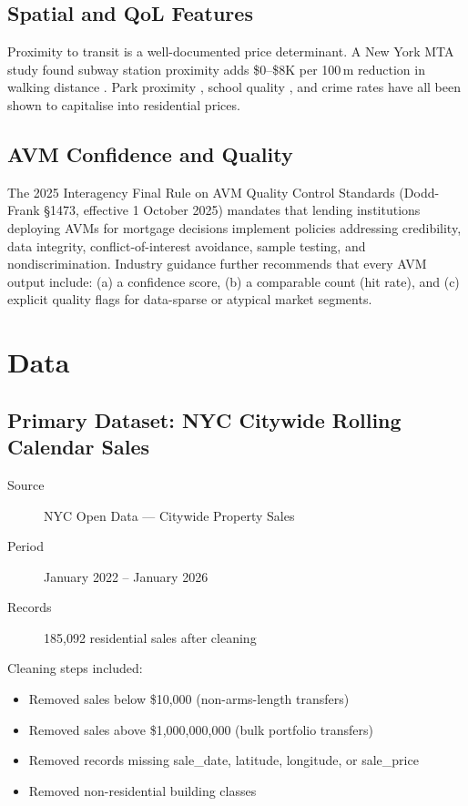 \documentclass[11pt, a4paper, twoside]{article}
\begin{document}
\subsection{Spatial and QoL Features}
Proximity to transit is a well-documented price determinant. A New York MTA
study found subway station proximity adds \$0--\$8K per 100\,m reduction in
walking distance \cite{hess2007}. Park proximity \cite{lutzenhiser2001}, school
quality \cite{black1999}, and crime rates \cite{ihlanfeldt2010} have all been
shown to capitalise into residential prices.

\subsection{AVM Confidence and Quality}
The 2025 Interagency Final Rule on AVM Quality Control Standards
\cite{avm_qc_rule2025} (Dodd-Frank \S 1473, effective 1 October 2025)
mandates that lending institutions deploying AVMs for mortgage decisions
implement policies addressing credibility, data integrity, conflict-of-interest
avoidance, sample testing, and nondiscrimination. Industry guidance further
recommends that every AVM output include: (a) a confidence score,
(b) a comparable count (hit rate), and (c) explicit quality flags for
data-sparse or atypical market segments.

\section{Data}
\label{sec:data}

\subsection{Primary Dataset: NYC Citywide Rolling Calendar Sales}
\begin{description}
  \item[Source] NYC Open Data --- Citywide Property Sales
  \item[Period] January 2022 -- January 2026
  \item[Records] 185,092 residential sales after cleaning
\end{description}

Cleaning steps included:
\begin{itemize}
  \item Removed sales below \$10,000 (non-arms-length transfers)
  \item Removed sales above \$1,000,000,000 (bulk portfolio transfers)
  \item Removed records missing sale\_date, latitude, longitude, or sale\_price
  \item Removed non-residential building classes
\end{itemize}
\end{document}
